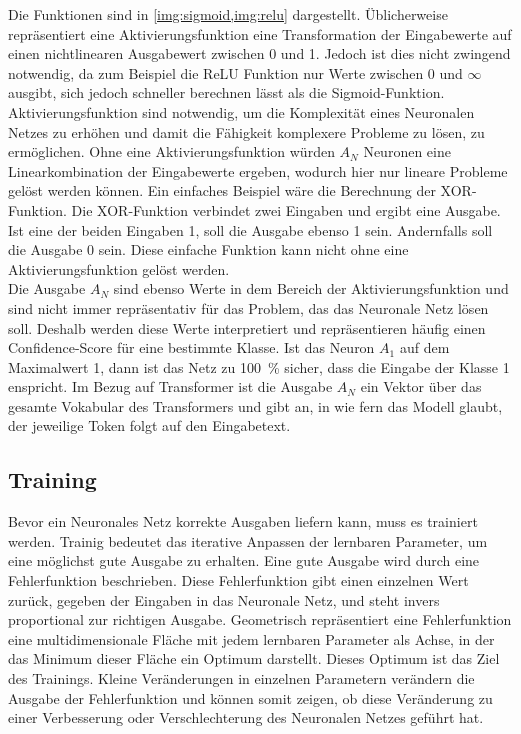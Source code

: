 Die Funktionen sind in \cref{img:sigmoid,img:relu} dargestellt.
Üblicherweise repräsentiert eine Aktivierungsfunktion eine Transformation der Eingabewerte auf einen nichtlinearen Ausgabewert zwischen 0 und 1.
Jedoch ist dies nicht zwingend notwendig, da zum Beispiel die ReLU Funktion nur Werte zwischen 0 und $\infty$ ausgibt, sich jedoch schneller berechnen lässt als die Sigmoid-Funktion.
Aktivierungsfunktion sind notwendig, um die Komplexität eines Neuronalen Netzes zu erhöhen und damit die Fähigkeit komplexere Probleme zu lösen, zu ermöglichen.
Ohne eine Aktivierungsfunktion würden $A_N$ Neuronen eine Linearkombination der Eingabewerte ergeben, wodurch hier nur lineare Probleme gelöst werden können.
Ein einfaches Beispiel wäre die Berechnung der XOR-Funktion.
Die XOR-Funktion verbindet zwei Eingaben und ergibt eine Ausgabe. Ist eine der beiden Eingaben 1, soll die Ausgabe ebenso 1 sein.
Andernfalls soll die Ausgabe 0 sein.
Diese einfache Funktion kann nicht ohne eine Aktivierungsfunktion gelöst werden.\\

Die Ausgabe $A_N$ sind ebenso Werte in dem Bereich der Aktivierungsfunktion und sind nicht immer repräsentativ für das Problem, das das Neuronale Netz lösen soll.
Deshalb werden diese Werte interpretiert und repräsentieren häufig einen Confidence-Score für eine bestimmte Klasse.
Ist das Neuron $A_1$ auf dem Maximalwert 1, dann ist das Netz zu \SI{100}{\percent} sicher, dass die Eingabe der Klasse 1 enspricht.
Im Bezug auf Transformer ist die Ausgabe $A_N$ ein Vektor über das gesamte Vokabular des Transformers und gibt an, in wie fern das Modell glaubt, der jeweilige Token folgt auf den Eingabetext.\\

\subsection{Training}\label{subsec:grundlagen:training}
Bevor ein Neuronales Netz korrekte Ausgaben liefern kann, muss es trainiert werden.
Trainig bedeutet das iterative Anpassen der lernbaren Parameter, um eine möglichst gute Ausgabe zu erhalten.
Eine gute Ausgabe wird durch eine Fehlerfunktion beschrieben.
Diese Fehlerfunktion gibt einen einzelnen Wert zurück, gegeben der Eingaben in das Neuronale Netz, und steht invers proportional zur richtigen Ausgabe.
Geometrisch repräsentiert eine Fehlerfunktion eine multidimensionale Fläche mit jedem lernbaren Parameter als Achse, in der das Minimum dieser Fläche ein Optimum darstellt.
Dieses Optimum ist das Ziel des Trainings.
Kleine Veränderungen in einzelnen Parametern verändern die Ausgabe der Fehlerfunktion und können somit zeigen, ob diese Veränderung zu einer Verbesserung oder Verschlechterung des Neuronalen Netzes geführt hat.\\

